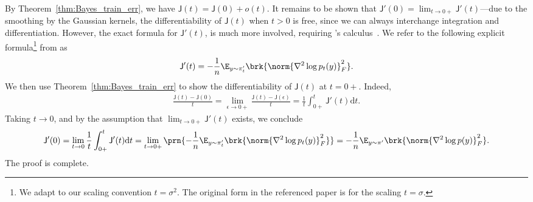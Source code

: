 \documentclass[11pt]{article}
\newcommand{\de}{\mathrm{d}}
\newcommand{\jfunc}{\mathsf{J}}
\begin{document}
By  Theorem~\ref{thm:Bayes_train_err}, we have $\jfunc(t) = \jfunc(0) + o(t)$. It remains to be shown that $\jfunc'(0) = \lim_{t \to 0+} \jfunc'(t)$---due to the smoothing by the Gaussian kernels, the differentiability of $\jfunc(t)$ when $t > 0$ is free, since we can always interchange integration and differentiation. However, the exact formula for $\jfunc'(t)$, is much more involved, requiring \citeauthor{bakry2006diffusions}'s calculus~\citep{bakry2006diffusions, bakry2013analysis}. We refer to the following explicit formula\footnote{We adapt to our scaling convention $t=\sigma^2$. The original form in the referenced paper is for the scaling $t = \sigma$.} from \cite[Eq.~(3.2)]{ledoux2016heat} as
\begin{align*}
    \jfunc'(t) = -\frac{1}{n} \E_{y \sim \pi_{t}'} \brk{\norm{\nabla^2 \log p_t(y)}_F^2}.
\end{align*}
We then use Theorem~\ref{thm:Bayes_train_err} to show the differentiability of $\jfunc(t)$ at $t=0+$. Indeed,
\begin{align*}
    \frac{\jfunc(t) - \jfunc(0)}{t} = \lim_{\epsilon \to 0+} \frac{\jfunc(t) - \jfunc(\epsilon)}{t} = \frac{1}{t} \int_{0+}^t \jfunc'(t) \de t. 
\end{align*}
Taking $t \to 0$, and by the assumption that $\lim_{t \to 0+}\jfunc'(t)$ exists, we conclude
\begin{align*}
    \jfunc'(0) = \lim_{t \to 0} \frac{1}{t} \int_{0+}^t \jfunc'(t) \de t = \lim_{t \to 0+} \prn{-\frac{1}{n} \E_{y \sim \pi_{t}'} \brk{\norm{\nabla^2 \log p_t(y)}_F^2}} = -\frac{1}{n} \E_{y \sim \pi'} \brk{\norm{\nabla^2 \log p(y)}_F^2}. 
\end{align*}
The proof is complete.
\end{document}
